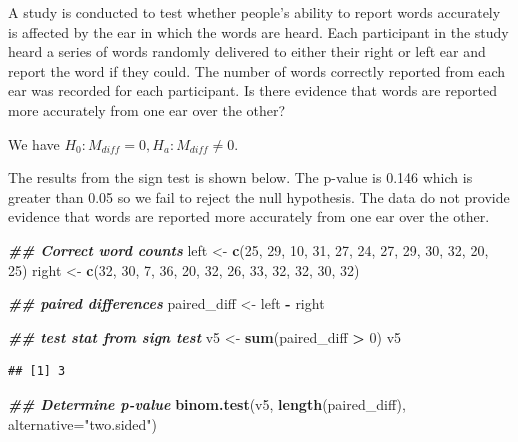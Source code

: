 \documentclass[
]{book}
\newenvironment{Shaded}{\begin{snugshade}}{\end{snugshade}}
\newcommand{\AttributeTok}[1]{\textcolor[rgb]{0.13,0.29,0.53}{#1}}
\newcommand{\DecValTok}[1]{\textcolor[rgb]{0.00,0.00,0.81}{#1}}
\newcommand{\DocumentationTok}[1]{\textcolor[rgb]{0.56,0.35,0.01}{\textbf{\textit{#1}}}}
\newcommand{\FunctionTok}[1]{\textcolor[rgb]{0.13,0.29,0.53}{\textbf{#1}}}
\newcommand{\NormalTok}[1]{#1}
\newcommand{\OtherTok}[1]{\textcolor[rgb]{0.56,0.35,0.01}{#1}}
\newcommand{\SpecialCharTok}[1]{\textcolor[rgb]{0.81,0.36,0.00}{\textbf{#1}}}
\newcommand{\StringTok}[1]{\textcolor[rgb]{0.31,0.60,0.02}{#1}}
\theoremstyle{definition}
\theoremstyle{definition}
\theoremstyle{definition}
\theoremstyle{definition}
\theoremstyle{remark}
\begin{document}
A study is conducted to test whether people's ability to report words accurately is affected by the ear in which the words are heard. Each participant in the study heard a series of words randomly delivered to either their right or left ear and report the word if they could. The number of words correctly reported from each ear was recorded for each participant. Is there evidence that words are reported more accurately from one ear over the other?

We have \(H_0: M_{diff} = 0, H_a: M_{diff} \neq 0\).

The results from the sign test is shown below. The p-value is 0.146 which is greater than 0.05 so we fail to reject the null hypothesis. The data do not provide evidence that words are reported more accurately from one ear over the other.

\begin{Shaded}
\begin{Highlighting}[]
\DocumentationTok{\#\# Correct word counts}
\NormalTok{left }\OtherTok{\textless{}{-}} \FunctionTok{c}\NormalTok{(}\DecValTok{25}\NormalTok{, }\DecValTok{29}\NormalTok{, }\DecValTok{10}\NormalTok{, }\DecValTok{31}\NormalTok{, }\DecValTok{27}\NormalTok{, }\DecValTok{24}\NormalTok{, }\DecValTok{27}\NormalTok{, }\DecValTok{29}\NormalTok{, }\DecValTok{30}\NormalTok{, }\DecValTok{32}\NormalTok{, }\DecValTok{20}\NormalTok{, }\DecValTok{25}\NormalTok{)}
\NormalTok{right }\OtherTok{\textless{}{-}} \FunctionTok{c}\NormalTok{(}\DecValTok{32}\NormalTok{, }\DecValTok{30}\NormalTok{, }\DecValTok{7}\NormalTok{, }\DecValTok{36}\NormalTok{, }\DecValTok{20}\NormalTok{, }\DecValTok{32}\NormalTok{, }\DecValTok{26}\NormalTok{, }\DecValTok{33}\NormalTok{, }\DecValTok{32}\NormalTok{, }\DecValTok{32}\NormalTok{, }\DecValTok{30}\NormalTok{, }\DecValTok{32}\NormalTok{)}

\DocumentationTok{\#\# paired differences}
\NormalTok{paired\_diff }\OtherTok{\textless{}{-}}\NormalTok{ left }\SpecialCharTok{{-}}\NormalTok{ right}

\DocumentationTok{\#\# test stat from sign test}
\NormalTok{v5 }\OtherTok{\textless{}{-}} \FunctionTok{sum}\NormalTok{(paired\_diff }\SpecialCharTok{\textgreater{}} \DecValTok{0}\NormalTok{)}
\NormalTok{v5}
\end{Highlighting}
\end{Shaded}

\begin{verbatim}
## [1] 3
\end{verbatim}

\begin{Shaded}
\begin{Highlighting}[]
\DocumentationTok{\#\# Determine p{-}value}
\FunctionTok{binom.test}\NormalTok{(v5, }\FunctionTok{length}\NormalTok{(paired\_diff), }\AttributeTok{alternative=}\StringTok{"two.sided"}\NormalTok{)}
\end{Highlighting}
\end{Shaded}
\end{document}
